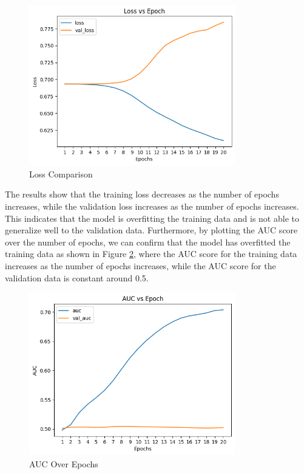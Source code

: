 \begin{figure}[H]
    \centering
    \includegraphics[width=0.8\textwidth]{assets/loss_epochs_20.png}
    \caption[Loss Comparison]{Loss Comparison}
    \label{fig:LossComparison}
\end{figure}

The results show that the training loss decreases as the number of epochs increases, while the validation loss increases as the number of epochs increases. This indicates that the model is overfitting the training data and is not able to generalize well to the validation data. Furthermore, by plotting the AUC score over the number of epochs, we can confirm that the model has overfitted the training data as shown in Figure \ref{fig:AUCOverEpochs}, where the AUC score for the training data increases as the number of epochs increases, while the AUC score for the validation data is constant around 0.5.


\begin{figure}[H]
    \centering
    \includegraphics[width=0.8\textwidth]{assets/auc_epochs_20.png}
    \caption[AUC Over Epochs]{AUC Over Epochs}
    \label{fig:AUCOverEpochs}
\end{figure}


